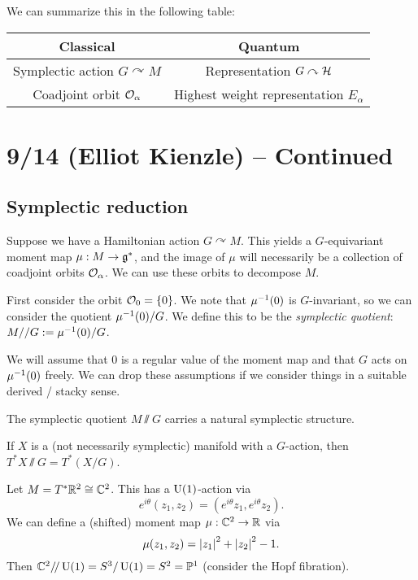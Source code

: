 \documentclass{article}
\begin{document}
We can summarize this in the following table:

\begin{center}
	\begin{tabular}{c|c}
		Classical & Quantum \\ \hline
		Symplectic action $G \curvearrowright M$ & Representation $G \curvearrowright \mathcal{H}$ \\
		Coadjoint orbit $\mathcal{O}_\alpha$ & Highest weight representation $E_\alpha$
	\end{tabular}
\end{center}

\section{9/14 (Elliot Kienzle) -- Continued}

\subsection{Symplectic reduction}

Suppose we have a Hamiltonian action $G \curvearrowright M$.
This yields a $G$-equivariant moment map $\mu: M \to \mathfrak{g}^*$, and the image of $\mu$ will necessarily be a collection of coadjoint orbits $\mathcal{O}_\alpha$.
We can use these orbits to decompose $M$.

First consider the orbit $\mathcal{O}_0 = \{ 0 \}$.
We note that $\mu^{-1}(0)$ is $G$-invariant, so we can consider the quotient $\mu^{-1}(0) / G$.
We define this to be the \emph{symplectic quotient}: $M // G := \mu^{-1}(0) / G$.

We will assume that $0$ is a regular value of the moment map and that $G$ acts on $\mu^{-1}(0)$ freely.
We can drop these assumptions if we consider things in a suitable derived / stacky sense.

\begin{thm}
	The symplectic quotient $M \sslash G$ carries a natural symplectic structure.
\end{thm}

\begin{ex}
	If $X$ is a (not necessarily symplectic) manifold with a $G$-action, then $T^*X \sslash G = T^* (X/G)$.
\end{ex}

\begin{ex}
	Let $M = T^* \mathbb{R}^2 \cong \mathbb{C}^2$.
	This has a $\operatorname{U}(1)$-action via 
	\[
		e^{i\theta} (z_1, z_2) = (e^{i \theta} z_1, e^{i \theta} z_2).
	\]
	We can define a (shifted) moment map $\mu: \mathbb{C}^2 \to \mathbb{R}$ via 
	\[
		\mu(z_1, z_2) = \left|z_1\right|^2 + \left|z_2\right|^2 - 1.
	\]
	Then $\mathbb{C}^2 /\mkern-3mu/ \operatorname{U}(1) = S^3 / \operatorname{U}(1) = S^2 = \mathbb{P}^1$ (consider the Hopf fibration).
\end{ex}
\end{document}
